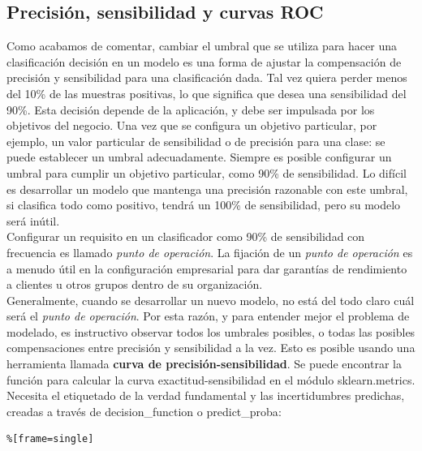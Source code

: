 {\subsection{Precisión, sensibilidad  y curvas ROC}


Como acabamos de comentar, cambiar el umbral que se utiliza para hacer una clasificación decisión en un modelo es una forma de ajustar la compensación de precisión  y sensibilidad para una clasificación dada.
Tal vez quiera perder menos del 10\% de las muestras positivas, lo que significa que  desea una sensibilidad del  90\%.  Esta decisión depende de la aplicación, y debe ser impulsada por los objetivos del negocio.
Una vez que se configura un objetivo particular, por ejemplo, un    valor particular  de sensibilidad
  o de precisión para una clase: se puede establecer un umbral adecuadamente. Siempre es posible  configurar  un umbral  para cumplir un objetivo particular, como 90\% de sensibilidad.    Lo difícil es desarrollar un modelo  que  mantenga  una precisión  razonable con este umbral,  si  
clasifica todo como  positivo, tendrá un 100\% de sensibilidad, pero su modelo será inútil.\\

  Configurar  un requisito en un clasificador como 90\%  de  sensibilidad   con frecuencia  es llamado {\emph{ punto de operación}}.   La fijación de un {\emph{ punto de operación}}  es a menudo útil en  la configuración empresarial para dar garantías  de rendimiento a clientes u otros grupos dentro de su organización.\\

Generalmente, cuando se desarrollar un nuevo modelo, no está del todo claro cuál será el {\emph{ punto de operación}}. Por esta razón, y para entender mejor el problema de modelado, es instructivo observar  todos los umbrales posibles, o todas las posibles compensaciones entre precisión y sensibilidad a la vez. 
Esto es posible usando una herramienta llamada {\bf{curva de precisión-sensibilidad}}. Se puede encontrar la función para calcular la curva exactitud-sensibilidad en el módulo {\ttfamily sklearn.metrics}. Necesita el etiquetado de la verdad fundamental y las incertidumbres predichas, creadas a través de {\ttfamily decision\_function} o {\ttfamily  predict\_proba}: 

\begin{lstlisting}%[frame=single]


\end{lstlisting}}
